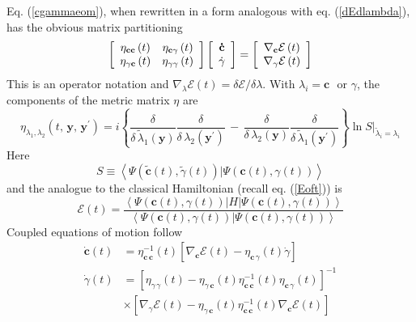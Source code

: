 \documentclass[aps,preprint]{revtex4}%
\begin{document}
Eq. (\ref{cgammaeom}), when rewritten in a form analogous with eq.
(\ref{dEdlambda}), has the obvious matrix partitioning
\begin{equation}
\left[
\begin{array}
[c]{cc}%
\eta_{\mathbf{cc}}\left(  t\right)  & \eta_{\mathbf{c}\gamma}\left(  t\right)
\\
\eta_{\gamma\mathbf{c}}\left(  t\right)  & \eta_{\gamma\gamma}\left(
t\right)
\end{array}
\right]  \left[
\begin{array}
[c]{c}%
\mathbf{\dot{c}}\\
\dot{\gamma}%
\end{array}
\right]  =\left[
\begin{array}
[c]{c}%
\nabla_{\mathbf{c}}\mathcal{E}\left(  t\right) \\
\nabla_{\gamma}\mathcal{E}\left(  t\right)
\end{array}
\right]  \label{partmat1}%
\end{equation}
This is an operator notation and $\nabla_{\lambda}\mathcal{E}\left(  t\right)
=\delta\mathcal{E}/\delta\lambda$. With $\lambda_{i}=\mathbf{c}\,${\ or
}$\gamma$, the components of the metric matrix $\eta$ are
\begin{equation}
\eta_{\lambda_{1},\lambda_{2}}(t,\,\mathbf{y},\,\mathbf{y}^{\prime})=i\left\{
\frac{\delta}{\delta\,\tilde{\lambda}_{1}(\mathbf{y})}\frac{\delta}%
{\delta\,\lambda_{2}(\mathbf{y}^{\prime})}\,-\,\frac{\delta}{\delta
\,\lambda_{2}(\mathbf{y})}\frac{\delta}{\delta\,\tilde{\lambda}_{1}%
(\mathbf{y}^{\prime})}\right\}  \ln S|_{\tilde{\lambda}_{i}=\lambda_{i}}
\label{etamat}%
\end{equation}
Here
\begin{equation}
S\equiv\left\langle \Psi(\tilde{\mathbf{c}}(t),\tilde{\gamma}(t))|\Psi
(\mathbf{c}(t),\gamma(t))\right\rangle
\end{equation}
and the analogue to the classical Hamiltonian (recall eq. (\ref{Eoft})) is
\begin{equation}
\mathcal{E}(t)=\frac{\left\langle \Psi(\mathbf{c}(t),\gamma(t))|H|\Psi
(\mathbf{c}(t),\gamma(t))\right\rangle }{\left\langle \Psi(\mathbf{c}%
(t),\gamma(t))|\Psi(\mathbf{c}(t),\gamma(t))\right\rangle } \label{Eofcgammat}%
\end{equation}
Coupled equations of motion follow
\begin{align}
\dot{\mathbf{c}}(t)  &  =\eta_{\mathbf{c\,c}}^{-1}(t)\left[  \nabla
_{\mathbf{c}}\mathcal{E}(t)-\eta_{\mathbf{c}\,\gamma}(t)\dot{\gamma}\right]
\nonumber\\
\dot{\gamma}(t)  &  =\left[  \eta_{\gamma\,\gamma}(t)-\eta_{\gamma
\,\mathbf{c}}(t)\eta_{\mathbf{c}\,\mathbf{c}}^{-1}(t)\eta_{\mathbf{c}\,\gamma
}(t)\right]  ^{-1}\nonumber\\
&  \times\left[  \nabla_{\gamma}\mathcal{E}(t)-\eta_{\gamma\,\mathbf{c}%
}(t)\eta_{\mathbf{c}\,\mathbf{c}}^{-1}(t)\nabla_{\mathbf{c}}\mathcal{E}%
(t)\right]  \label{cdotgammadot}%
\end{align}
\end{document}
